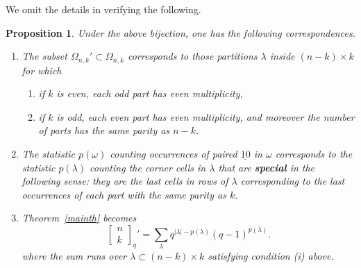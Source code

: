 \documentclass[10pt]{amsart}
\theoremstyle{plain}
\newtheorem{proposition}[theorem]{Proposition}
\theoremstyle{definition}
\theoremstyle{remark}
\numberwithin{equation}{section}
\newcommand\qbin[3]{\left[\begin{matrix} #1 \\ #2 \end{matrix} \right]_{#3}}
\begin{document}
We omit the details in verifying the following.
\begin{proposition}
 \label{mainthpart}
Under the above bijection, one has the following
correspondences.
\begin{enumerate}
\item[(i)]
The subset $\Omega_{n,k}' \subset \Omega_{n,k}$ corresponds
to those partitions $\lambda$ inside $(n-k)\times k$ for which 
 \begin{enumerate}
 \item if $k$ is even, each odd part has even multiplicity,
 \item if $k$ is odd, each even part has even multiplicity, and moreover the
 number of parts has the same parity as $n-k$.
 \end{enumerate}
\item[(ii)]
The statistic $p(\omega)$ counting
occurrences of paired $\underline{10}$ in $\omega$ 
corresponds to the statistic $p(\lambda)$ counting
the corner cells in $\lambda$ that are {\bf special}
in the following sense:  they are the last cells in rows
of $\lambda$ corresponding to the last occurrences
of each part with the same parity as $k$.
\item[(iii)]
Theorem~\ref{mainth} becomes
$$
\qbin{n}{k}{q}' = 
  \sum_{ \lambda } q^{|\lambda|-p(\lambda)} (q-1)^{p(\lambda)}.
$$
where the sum runs over $\lambda \subset (n-k) \times k$
satisfying condition (i) above.
\end{enumerate}
\end{proposition}
\end{document}
